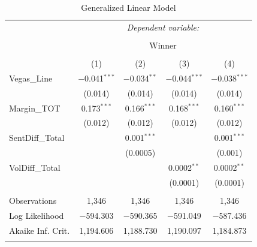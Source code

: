 \documentclass[12pt]{article}
\begin{document}
\begin{doublespacing}
\begin{table}[H] 
\centering 
\caption{Generalized Linear Model} 
\label{} 
\begin{tabular*}{\textwidth}{@{\extracolsep{\fill}}lcccc} 
\hline 
\hline
 & \multicolumn{4}{c}{\textit{Dependent variable:}} \\ 
\cline{2-5} 
\\[-3.0ex] & \multicolumn{4}{c}{Winner} \\ 
\\[-1.5ex] & (1) & (2) & (3) & (4)\\ 
\hline
 Vegas\_Line & $-$0.041$^{***}$ & $-$0.034$^{**}$ & $-$0.044$^{***}$ & $-$0.038$^{***}$ \\ 
  & (0.014) & (0.014) & (0.014) & (0.014) \\ 
 Margin\_TOT & 0.173$^{***}$ & 0.166$^{***}$ & 0.168$^{***}$ & 0.160$^{***}$ \\ 
  & (0.012) & (0.012) & (0.012) & (0.012) \\ 
 SentDiff\_Total &  & 0.001$^{***}$ &  & 0.001$^{***}$ \\ 
  &  & (0.0005) &  & (0.001) \\ 
 VolDiff\_Total &  &  & 0.0002$^{**}$ & 0.0002$^{**}$ \\ 
  &  &  & (0.0001) & (0.0001) \\ 
\hline \\[-1.8ex] 
Observations & 1,346 & 1,346 & 1,346 & 1,346 \\ 
Log Likelihood & $-$594.303 & $-$590.365 & $-$591.049 & $-$587.436 \\ 
Akaike Inf. Crit. & 1,194.606 & 1,188.730 & 1,190.097 & 1,184.873 \\
\hline 
\hline \\[-1.8ex] 
\end{tabular*} 
\end{table} 

\end{doublespacing}
\end{document}
